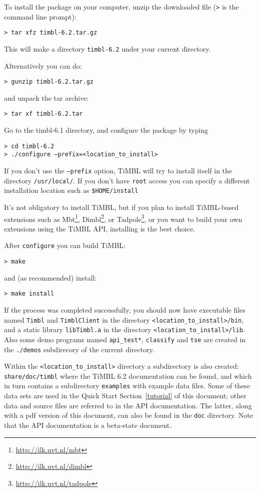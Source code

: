 \documentclass{report}
\begin{document}
To install the package on your computer, unzip the downloaded file ({\tt >} is the command line prompt):

{\tt > tar xfz timbl-6.2.tar.gz}

This will make a directory {\tt timbl-6.2} under your current directory.

Alternatively you can do:

{\tt > gunzip timbl-6.2.tar.gz}

and unpack the tar archive:

{\tt > tar xf timbl-6.2.tar}

Go to the timbl-6.1 directory, and configure the package by typing

{\tt > cd timbl-6.2} \\
{\tt > ./configure --prefix=<location\_to\_install>}

If you don't use the {\tt --prefix} option, TiMBL will try to install itself in the directory {\tt /usr/local/}.  If you don't have {\tt root} access you can specify a different installation location such as {\tt \$HOME/install}

It's not obligatory to install TiMBL, but if you plan to install TiMBL-based extensions such as Mbt\footnote{\url{http://ilk.uvt.nl/mbt}}, Dimbl\footnote{\url{http://ilk.uvt.nl/dimbl}}, or Tadpole\footnote{\url{http://ilk.uvt.nl/tadpole}}, or you want to build your own extensions using the TiMBL API, installing is the best choice.

After {\tt configure} you can build TiMBL:

{\tt > make}

and (as recommended) install:

{\tt > make install }

If the process was completed successfully, you should now have executable files
named {\tt Timbl} and {\tt TimblClient} in the directory 
{\tt <location\_to\_install>/bin}, and a static library {\tt libTimbl.a} in the
 directory {\tt <location\_to\_install>/lib}.
Also some demo programs named {\tt api\_test*}, {\tt classify} and {\tt tse}
are created in the {\tt ./demos} subdirecory of the current directory.

Within the {\tt <location\_to\_install>} directory a subdirectory is also created: {\tt share/doc/timbl} where the TiMBL 6.2 documentation can be found, and which in turn contains a subdirectory {\tt examples} with example data files. Some of these data sets are used in the Quick Start Section~\ref{tutorial} of this document; other data and source files are referred to in the API documentation. The latter, along with a pdf version of this document, can also be found in the {\tt doc} directory. Note that the API documentation is a beta-state document.
\end{document}
